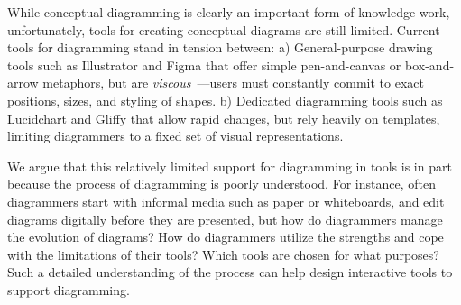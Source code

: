 



While conceptual diagramming is clearly an important form of knowledge work, unfortunately, tools for creating conceptual diagrams are still limited. Current tools for diagramming stand in tension between: a) General-purpose drawing tools such as Illustrator and Figma that offer simple pen-and-canvas or box-and-arrow metaphors, but are \emph{viscous}~\cite{green_usability_1996}---users must constantly commit to exact positions, sizes, and styling of shapes. b) Dedicated diagramming tools such as Lucidchart and Gliffy that allow rapid changes, but rely heavily on templates, limiting diagrammers to a fixed set of visual representations. 

We argue that this relatively limited support for diagramming in tools is in part because the process of diagramming is poorly understood. For instance, often diagrammers start with informal media such as paper or whiteboards, and edit diagrams digitally before they are presented, but how do diagrammers manage the evolution of diagrams? How do diagrammers utilize the strengths and cope with the limitations of their tools? Which tools are chosen for what purposes?  Such a detailed understanding of the process can help design interactive tools to support diagramming. 

